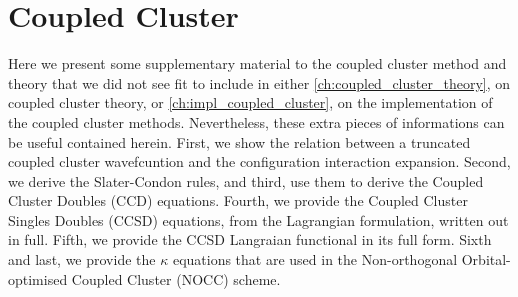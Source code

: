 \chapter{Coupled Cluster}

Here we present some supplementary material to the coupled cluster method and 
theory that we did not see fit to include in either \autoref{ch:coupled_cluster_theory},
on coupled cluster theory, or \autoref{ch:impl_coupled_cluster}, on the implementation 
of the coupled cluster methods. Nevertheless, these extra pieces of informations can 
be useful contained herein. First, we show the relation between a truncated coupled cluster wavefcuntion and
the configuration interaction expansion. Second, we derive the Slater-Condon rules, and 
third, use them to derive the Coupled Cluster Doubles (CCD) equations. Fourth, 
we provide the Coupled Cluster Singles Doubles (CCSD) equations, from the 
Lagrangian formulation, written out in full. Fifth, we provide the CCSD Langraian 
functional in its full form. Sixth and last, we provide the $\kappa$ equations that 
are used in the Non-orthogonal Orbital-optimised Coupled Cluster (NOCC) scheme.












\clearemptydoublepage